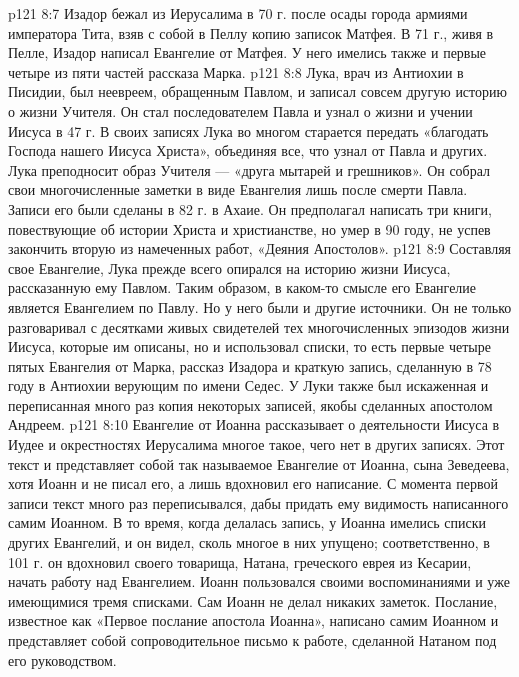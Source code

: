 \vs p121 8:7 Изадор бежал из Иерусалима в 70 г. после осады города армиями императора Тита, взяв с собой в Пеллу копию записок Матфея. В 71 г., живя в Пелле, Изадор написал Евангелие от Матфея. У него имелись также и первые четыре из пяти частей рассказа Марка.
\vs p121 8:8 \pc {}\bibnobreakspace {} Лука, врач из Антиохии в Писидии, был неевреем, обращенным Павлом, и записал совсем другую историю о жизни Учителя. Он стал последователем Павла и узнал о жизни и учении Иисуса в 47 г. В своих записях Лука во многом старается передать «благодать Господа нашего Иисуса Христа», объединяя все, что узнал от Павла и других. Лука преподносит образ Учителя --- «друга мытарей и грешников». Он собрал свои многочисленные заметки в виде Евангелия лишь после смерти Павла. Записи его были сделаны в 82 г. в Ахаие. Он предполагал написать три книги, повествующие об истории Христа и христианстве, но умер в 90 году, не успев закончить вторую из намеченных работ, «Деяния Апостолов».
\vs p121 8:9 Составляя свое Евангелие, Лука прежде всего опирался на историю жизни Иисуса, рассказанную ему Павлом. Таким образом, в каком\hyp{}то смысле его Евангелие является Евангелием по Павлу. Но у него были и другие источники. Он не только разговаривал с десятками живых свидетелей тех многочисленных эпизодов жизни Иисуса, которые им описаны, но и использовал списки, то есть первые четыре пятых Евангелия от Марка, рассказ Изадора и краткую запись, сделанную в 78 году в Антиохии верующим по имени Седес. У Луки также был искаженная и переписанная много раз копия некоторых записей, якобы сделанных апостолом Андреем.
\vs p121 8:10 \pc {}\bibnobreakspace {} Евангелие от Иоанна рассказывает о деятельности Иисуса в Иудее и окрестностях Иерусалима многое такое, чего нет в других записях. Этот текст и представляет собой так называемое Евангелие от Иоанна, сына Зеведеева, хотя Иоанн и не писал его, а лишь вдохновил его написание. С момента первой записи текст много раз переписывался, дабы придать ему видимость написанного самим Иоанном. В то время, когда делалась запись, у Иоанна имелись списки других Евангелий, и он видел, сколь многое в них упущено; соответственно, в 101 г. он вдохновил своего товарища, Натана, греческого еврея из Кесарии, начать работу над Евангелием. Иоанн пользовался своими воспоминаниями и уже имеющимися тремя списками. Сам Иоанн не делал никаких заметок. Послание, известное как «Первое послание апостола Иоанна», написано самим Иоанном и представляет собой сопроводительное письмо к работе, сделанной Натаном под его руководством.
